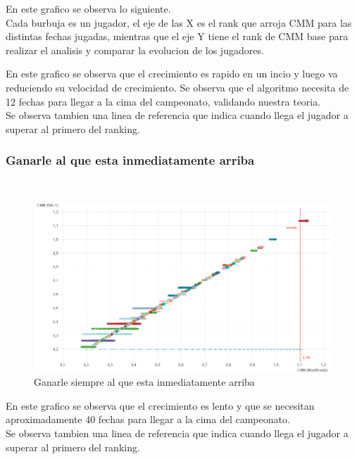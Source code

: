En este grafico se observa lo siguiente.\\
Cada burbuja es un jugador, el eje de las X es el rank que arroja CMM para las distintas fechas jugadas, mientras que el eje Y tiene el rank de CMM base para 
realizar el analisis y comparar la evolucion de los jugadores.

En este grafico se observa que el crecimiento es rapido en un incio y luego va reduciendo su velocidad de crecimiento.
Se observa que el algoritmo necesita de 12 fechas para llegar a la cima del campeonato, validando nuestra teoria.\\

Se observa tambien una linea de referencia que indica cuando llega el jugador a superar al primero del ranking.\\

\subsubsection{Ganarle al que esta inmediatamente arriba}
\\

\begin{figure}[H]
\centering
\includegraphics[width=1\textwidth]{IMG/estrategia 4.png}
\caption{Ganarle siempre al que esta inmediatamente arriba}
\label{fig:Ganarle siempre al que esta inmediatamente arriba}
\end{figure}

En este grafico se observa que el crecimiento es lento y que se necesitan aproximadamente 40 fechas para llegar a la cima del campeonato.\\

Se observa tambien una linea de referencia que indica cuando llega el jugador a superar al primero del ranking.\\

